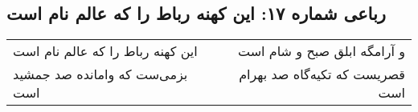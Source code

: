 \begin{center}
\section*{رباعی شماره ۱۷: این کهنه رباط را که عالم نام است}
\label{sec:sh017}
\begin{longtable}{l p{0.5cm} r}
این کهنه رباط را که عالم نام است
&&
و آرامگه ابلق صبح و شام است
\\
بزمی‌ست که وامانده صد جمشید است
&&
قصریست که تکیه‌گاه صد بهرام است
\\
\end{longtable}
\end{center}
